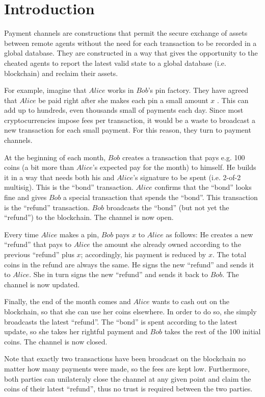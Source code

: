 \section{Introduction}
  Payment channels are constructions that permit the secure exchange of assets between
  remote agents without the need for each transaction to be recorded in a global database.
  They are constructed in a way that gives the opportunity to the cheated agents to report
  the latest valid state to a global database (i.e. blockchain) and reclaim their assets.

  For example, imagine that $Alice$ works in $Bob$'s pin factory. They have agreed that
  $Alice$ be paid right after she makes each pin a small amount $x$ \cite{bdevguide}. This
  can add up to hundreds, even thousands small of payments each day. Since most
  cryptocurrencies impose fees per transaction, it would be a waste to broadcast a new
  transaction for each small payment. For this reason, they turn to payment channels.

  At the beginning of each month, $Bob$ creates a transaction that pays e.g. 100 coins (a
  bit more than $Alice$'s expected pay for the month) to himself. He builds it in a way
  that needs both his and $Alice$'s signature to be spent (i.e. 2-of-2 multisig). This is
  the ``bond'' transaction. $Alice$ confirms that the ``bond'' looks fine and gives $Bob$
  a special transaction that spends the ``bond''. This transaction is the ``refund''
  transaction. $Bob$ broadcasts the ``bond'' (but not yet the ``refund'') to the
  blockchain. The channel is now open.

  Every time $Alice$ makes a pin, $Bob$ pays $x$ to $Alice$ as follows: He creates a new
  ``refund'' that pays to $Alice$ the amount she already owned according to the previous
  ``refund'' plus $x$; accordingly, his payment is reduced by $x$. The total coins in
  the refund are always the same. He signs the new ``refund'' and sends it to $Alice$. She
  in turn signs the new ``refund'' and sends it back to $Bob$. The channel is now updated.

  Finally, the end of the month comes and $Alice$ wants to cash out on the blockchain, so
  that she can use her coins elsewhere. In order to do so, she simply broadcasts the
  latest ``refund''. The ``bond'' is spent according to the latest update, so she takes
  her rightful payment and $Bob$ takes the rest of the 100 initial coins. The channel is
  now closed.

  Note that exactly two transactions have been broadcast on the blockchain no matter how
  many payments were made, so the fees are kept low. Furthermore, both parties can
  unilateraly close the channel at any given point and claim the coins of their latest
  ``refund'', thus no trust is required between the two parties.
